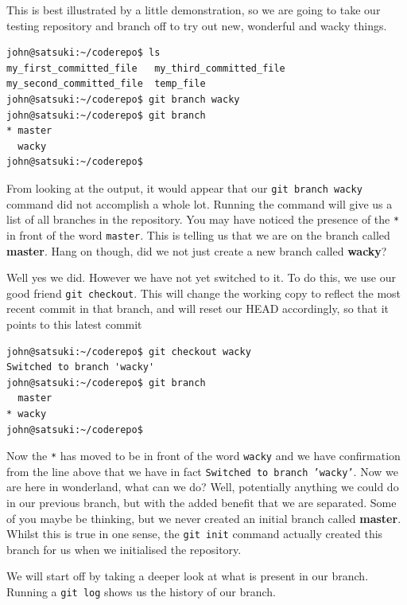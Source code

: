 This is best illustrated by a little demonstration, so we are going to take our testing repository and branch off to try out new, wonderful and wacky things.

\begin{Verbatim}
john@satsuki:~/coderepo$ ls
my_first_committed_file   my_third_committed_file
my_second_committed_file  temp_file
john@satsuki:~/coderepo$ git branch wacky
john@satsuki:~/coderepo$ git branch
* master
  wacky
john@satsuki:~/coderepo$
\end{Verbatim}

From looking at the output, it would appear that our \texttt{git branch wacky} command did not accomplish a whole lot.
Running the  command will give us a list of all branches in the repository.
You may have noticed the presence of the \texttt{*} in front of the word \texttt{master}.
This is telling us that we are on the branch called \textbf{master}.
Hang on though, did we not just create a new branch called \textbf{wacky}?

Well yes we did.
However we have not yet switched to it.
To do this, we use our good friend \texttt{git checkout}.
This will change the working copy to reflect the most recent commit in that branch, and will reset our HEAD accordingly, so that it points to this latest commit

\begin{Verbatim}
john@satsuki:~/coderepo$ git checkout wacky
Switched to branch 'wacky'
john@satsuki:~/coderepo$ git branch
  master
* wacky
john@satsuki:~/coderepo$
\end{Verbatim}

Now the \texttt{*} has moved to be in front of the word \texttt{wacky} and we have confirmation from the line above that we have in fact \texttt{Switched to branch 'wacky'}.
Now we are here in wonderland, what can we do?  Well, potentially anything we could do in our previous branch, but with the added benefit that we are separated.
Some of you maybe be thinking, but we never created an initial branch called \textbf{master}.
Whilst this is true in one sense, the \texttt{git init} command actually created this branch for us when we initialised the repository.

We will start off by taking a deeper look at what is present in our branch.
Running a \texttt{git log} shows us the history of our branch.

